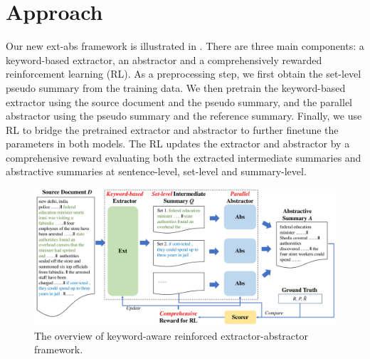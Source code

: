 \section{Approach}
\label{sec:approach}
Our new ext-abs framework is illustrated in .
There are three main components: a keyword-based extractor,
an abstractor and a comprehensively rewarded reinforcement learning (RL). 
As a preprocessing step, we first obtain the set-level pseudo 
summary from the training data.
We then pretrain the keyword-based extractor using the source document
and the pseudo summary, and 
the parallel abstractor using the pseudo summary and
the reference summary.
Finally, we use RL to bridge the pretrained extractor and 
abstractor to further finetune the parameters in both models. 
The RL updates the extractor and abstractor by a comprehensive reward 
evaluating both the extracted intermediate summaries and abstractive summaries 
at sentence-level, set-level and summary-level.

\begin{figure}[th]
    \centering
    \includegraphics[width=0.85\linewidth]{overview}
    \caption{The overview of keyword-aware reinforced extractor-abstractor framework. }
    \label{fig:overview}
\end{figure}


